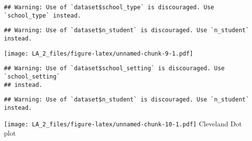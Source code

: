 \documentclass[
]{article}
\newenvironment{Shaded}{\begin{snugshade}}{\end{snugshade}}
\newcommand{\AttributeTok}[1]{\textcolor[rgb]{0.77,0.63,0.00}{#1}}
\newcommand{\FloatTok}[1]{\textcolor[rgb]{0.00,0.00,0.81}{#1}}
\newcommand{\FunctionTok}[1]{\textcolor[rgb]{0.00,0.00,0.00}{#1}}
\newcommand{\NormalTok}[1]{#1}
\newcommand{\SpecialCharTok}[1]{\textcolor[rgb]{0.00,0.00,0.00}{#1}}
\begin{document}
\begin{Shaded}
\end{Shaded}

\begin{verbatim}
## Warning: Use of `dataset$school_type` is discouraged. Use `school_type` instead.
\end{verbatim}

\begin{verbatim}
## Warning: Use of `dataset$n_student` is discouraged. Use `n_student` instead.
\end{verbatim}

\texttt{[image: LA\_2\_files/figure-latex/unnamed-chunk-9-1.pdf]}

\begin{Shaded}
\end{Shaded}

\begin{verbatim}
## Warning: Use of `dataset$school_setting` is discouraged. Use `school_setting`
## instead.
\end{verbatim}

\begin{verbatim}
## Warning: Use of `dataset$n_student` is discouraged. Use `n_student` instead.
\end{verbatim}

\texttt{[image: LA\_2\_files/figure-latex/unnamed-chunk-10-1.pdf]}
Cleveland Dot plot

\begin{Shaded}
\end{Shaded}
\end{document}
